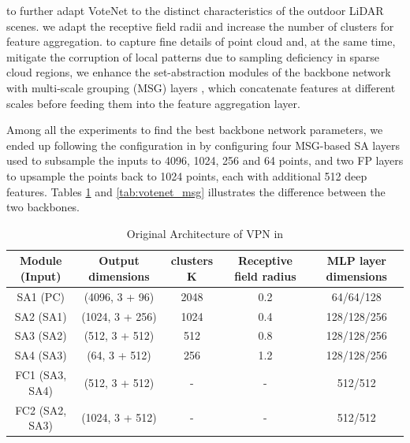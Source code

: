 \documentclass[10pt,twocolumn,letterpaper]{article}
\begin{document}
to further adapt VoteNet to the distinct characteristics of the outdoor LiDAR scenes. we adapt the receptive field radii and increase the number of clusters for feature aggregation. to capture fine details of point cloud and, at the same time, mitigate  the corruption of local patterns due to sampling deficiency in sparse cloud regions, we enhance the set-abstraction modules of the backbone network with multi-scale grouping (MSG) layers \cite{qi2017pointnet++}, which concatenate features at different scales before feeding them into the feature aggregation layer.

Among all the experiments to find the best backbone network parameters, we ended up following the configuration in \cite{shi2019pointrcnn} by configuring four MSG-based SA layers used to subsample the inputs to 4096, 1024, 256 and 64 points, and two FP layers to upsample the points back to 1024 points, each with additional 512 deep features. Tables \ref{tab:votenet_oringinal} and \ref{tab:votenet_msg} illustrates the difference between the two backbones.


\begin{table}
\label{tab:votenet_oringinal}
\begin{center}
\begin{tabular}{|c|c|c|c|c|}
\hline
Module (Input) & Output dimensions & clusters K & Receptive field radius & MLP layer dimensions \\
\hline\hline
SA1 (PC) & (4096, 3 + 96) & 2048 & 0.2 & 64/64/128 \\
SA2 (SA1) & (1024, 3 + 256) & 1024 & 0.4 & 128/128/256 \\
SA3 (SA2) & (512, 3 + 512) & 512 & 0.8 & 128/128/256 \\
SA4 (SA3) & (64, 3 + 512) & 256 & 1.2 & 128/128/256 \\
FC1 (SA3, SA4) & (512, 3 + 512) & - & - & 512/512 \\
FC2 (SA2, SA3) & (1024, 3 + 512) & - & - & 512/512 \\
\hline
\end{tabular}
\end{center}
\caption{Original Architecture of VPN in \cite{qi2019deep}}
\end{table}
\end{document}
